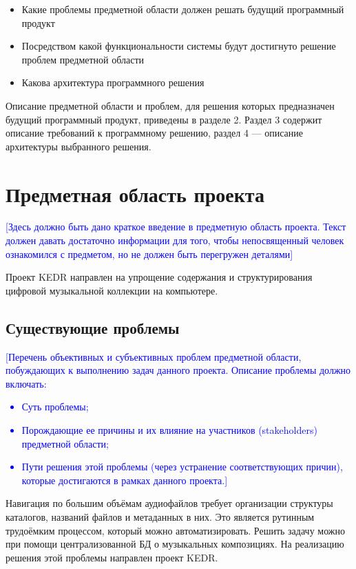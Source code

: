\documentclass[pdftex,12pt,a4paper]{report}
\providecommand{\comment}[1]{\textcolor{blue}{#1}}
\begin{document}
\begin{itemize}
	\item Какие проблемы предметной области должен решать будущий программный продукт
	\item Посредством какой функциональности системы будут достигнуто решение проблем предметной области
	\item Какова архитектура программного решения
\end{itemize}

Описание предметной области и проблем, для решения которых предназначен будущий программный продукт, приведены в разделе 2.
Раздел 3 содержит описание требований к программному решению, раздел 4 --- описание архитектуры выбранного решения.

\section{Предметная область проекта}
\comment{[Здесь должно быть дано краткое введение в предметную область проекта. Текст должен давать достаточно информации для того, чтобы непосвященный человек ознакомился с предметом, но не должен быть перегружен деталями]}

Проект KEDR направлен на упрощение содержания и структурирования цифровой музыкальной коллекции на компьютере.

\subsection{Существующие проблемы}
\comment{[Перечень объективных и субъективных проблем предметной области, побуждающих к выполнению задач данного проекта. Описание проблемы должно включать: 
	\begin{itemize}
		\item Суть проблемы;
		\item Порождающие ее причины и их влияние на участников (stakeholders)  предметной области; 
		\item Пути решения этой проблемы (через устранение соответствующих причин), которые достигаются в рамках данного проекта.]
	\end{itemize}}

Навигация по большим объёмам аудиофайлов требует организации структуры каталогов, названий файлов и метаданных в них.
Это является рутинным трудоёмким процессом, который можно автоматизировать.
Решить задачу можно при помощи централизованной БД о музыкальных композициях.
На реализацию решения этой проблемы направлен проект KEDR.
\end{document}
